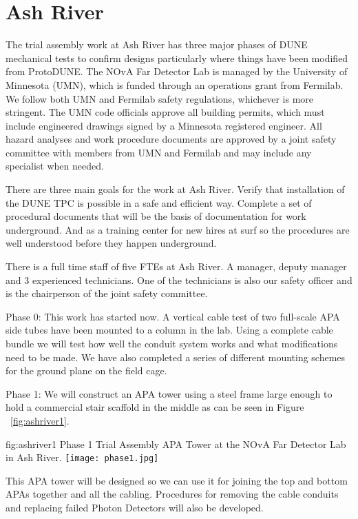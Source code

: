 \section{Ash River}

The trial assembly work at Ash River has three major phases of DUNE
mechanical tests to confirm designs particularly where things have
been modified from ProtoDUNE.  The NOvA Far Detector Lab is managed by
the University of Minnesota (UMN), which is funded through an
operations grant from Fermilab.  We follow both UMN and Fermilab
safety regulations, whichever is more stringent.  The UMN code
officials approve all building permits, which must include engineered
drawings signed by a Minnesota registered engineer. All hazard
analyses and work procedure documents are approved by a joint safety
committee with members from UMN and Fermilab and may include any
specialist when needed.

There are three main goals for the work at Ash River. Verify that
installation of the DUNE TPC is possible in a safe and efficient
way. Complete a set of procedural documents that will be the basis of
documentation for work underground.  And as a training center for new
hires at {surf} so the procedures are well understood before they happen
underground.

There is a full time staff of five FTEs at Ash River. A manager,
deputy manager and 3 experienced technicians.  One of the technicians
is also our safety officer and is the chairperson of the joint safety
committee.


Phase 0: This work has started now.  A vertical cable test of two
full-scale APA side tubes have been mounted to a column in the
lab. Using a complete cable bundle we will test how well the conduit
system works and what modifications need to be made. We have also
completed a series of different mounting schemes for the ground plane
on the field cage.

Phase 1: We will construct an APA tower using a steel frame large
enough to hold a commercial stair scaffold in the middle as can be
seen in Figure ~\ref{fig:ashriver1}.
\begin{dunefigure}{fig:ashriver1}
  {Phase 1 Trial Assembly APA Tower at the NOvA Far Detector Lab in Ash River.}
  \texttt{[image: phase1.jpg]}
\end{dunefigure}
This APA tower will be designed so we can
use it for joining the top and bottom APAs together and all the
cabling. Procedures for removing the cable conduits and replacing
failed Photon Detectors will also be developed.

